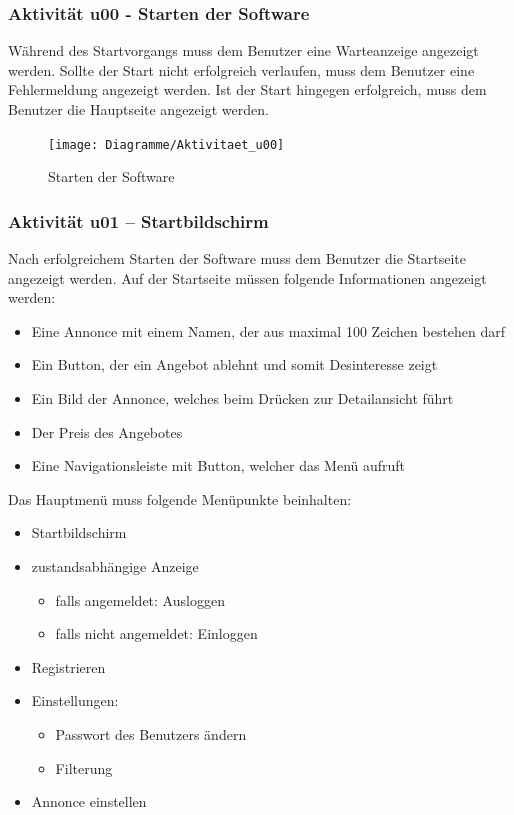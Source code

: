 \documentclass[a4paper,12pt,oneside]{scrartcl}
\begin{document}
\subsubsection{Aktivität u00 - Starten der Software}
Während des Startvorgangs muss dem Benutzer eine Warteanzeige angezeigt werden.
Sollte der Start nicht erfolgreich verlaufen, muss dem Benutzer eine Fehlermeldung angezeigt werden.
Ist der Start hingegen erfolgreich, muss dem Benutzer die Hauptseite angezeigt werden.

\begin{figure}[!htbp]
\centering
\noindent\texttt{[image: Diagramme/Aktivitaet\_u00]}
\caption{Starten der Software}
\end{figure}
\FloatBarrier


\hypertarget{u01}{\subsubsection{Aktivität u01 – Startbildschirm}}
Nach erfolgreichem Starten der Software muss dem Benutzer die Startseite angezeigt werden. 
Auf der Startseite müssen folgende Informationen angezeigt werden:
\begin{itemize}
	\item Eine Annonce mit einem Namen, der aus maximal 100 Zeichen bestehen darf
	\item Ein Button, der ein Angebot ablehnt und somit Desinteresse zeigt
	\item Ein Bild der Annonce, welches beim Drücken zur Detailansicht führt
	\item Der Preis des Angebotes
	\item Eine Navigationsleiste mit Button, welcher das Menü aufruft
\end{itemize}
Das Hauptmenü muss folgende Menüpunkte beinhalten:
\begin{itemize}
	\item Startbildschirm
	\item zustandsabhängige Anzeige
	\begin{itemize}
		\item falls angemeldet: Ausloggen 
		\item falls nicht angemeldet: Einloggen 
	\end{itemize}
	\item Registrieren
	\item Einstellungen:
	\begin{itemize}
		\item Passwort des Benutzers ändern
		\item Filterung
	\end{itemize}
	\item Annonce einstellen
\end{itemize}
\end{document}
